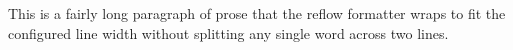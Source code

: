 This is a fairly long paragraph of prose
that the reflow formatter wraps to fit
the configured line width without
splitting any single word across two
lines.
